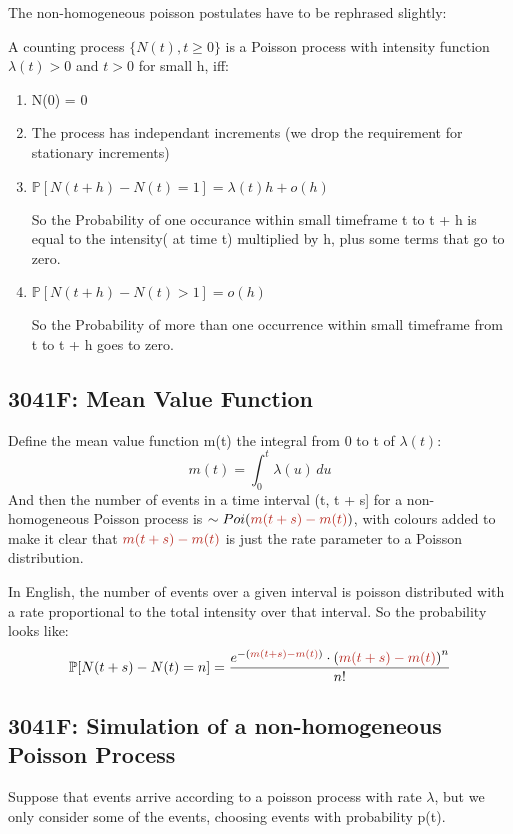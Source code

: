 The non-homogeneous poisson postulates have to be rephrased slightly:

A counting process \(\{N(t), t \ge 0\}\) is a Poisson process with intensity function
\( \lambda(t) > 0 \) and \(t > 0 \) for small h, iff:
\begin{enumerate}
    \item N(0) = 0
    \item The process has independant increments (we drop the requirement for stationary increments)
    \item \(\mathbb{P}[N(t + h) - N(t) = 1] = \lambda(t) h + o(h)\)

        So the Probability of one occurance within small timeframe t to t + h is equal to the intensity( at time t) multiplied by h, plus some terms that go to zero.
    \item \(\mathbb{P}[N(t + h) - N(t) > 1] = o(h)\)

        So the Probability of more than one occurrence within small timeframe from t to t + h goes to zero.
\end{enumerate}
\subsection{3041F: Mean Value Function}
Define the mean value function m(t) the integral from 0 to t of \(\lambda(t)\):
\begin{equation*}
    m(t) = \int_{0}^{t} \lambda(u) \, du
\end{equation*}
And then the number of events in a time interval (t, t + s] for a non-homogeneous Poisson 
process is \(\sim Poi({\color{BrickRed}{m(t + s) - m(t)}})\), with 
colours added to make it clear that \({\color{BrickRed}{m(t + s) - m(t)}}\) is just the 
rate parameter to a Poisson distribution.


In English, the number of events over a given interval is poisson 
distributed with a rate proportional to the total intensity over that interval. So the probability looks like:
\begin{equation*}
    \begin{aligned}
        \mathbb{P}[N(t + s) - N(t) = n] &= \frac{
            e^{-\left({\color{BrickRed}{m(t+s) - m(t)}}\right)} 
            \cdot \left( {\color{BrickRed}{m(t+s) - m(t)}}\right)^n
        }{n!} \\
        \end{aligned}
    \end{equation*}
    \subsection{3041F: Simulation of a non-homogeneous Poisson Process}
    Suppose that events arrive according to a poisson process with rate \(\lambda\), but we only consider some of the events, choosing events with probability p(t).\newline \newline

